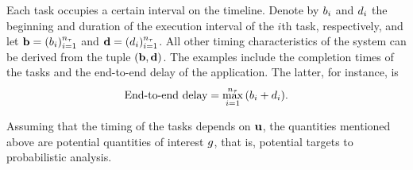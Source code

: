 Each task occupies a certain interval on the timeline. Denote by $b_i$ and
$d_i$ the beginning and duration of the execution interval of the $i$th task,
respectively, and let $\mathbf{b} = (b_i)_{i=1}^{{n_\tau}}$ and $\mathbf{d} = (d_i)_{i=1}^{{n_\tau}}$.
All other timing characteristics of the system can be derived from the tuple
$(\mathbf{b}, \mathbf{d})$. The examples include the completion times of the tasks and the
end-to-end delay of the application. The latter, for instance, is
\begin{equation} \elab{end-to-end-delay}
  \text{End-to-end delay} = \max_{i = 1}^\nt \, (\b_i + \d_i).
\end{equation}

Assuming that the timing of the tasks depends on $\mathbf{u}$, the quantities mentioned
above are potential quantities of interest $g$, that is, potential targets to
probabilistic analysis.
